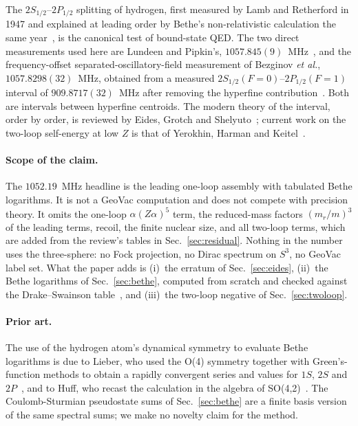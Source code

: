 \documentclass[11pt]{article}
\begin{document}
The $2S_{1/2}$--$2P_{1/2}$ splitting of hydrogen, first measured by
Lamb and Retherford in 1947 and explained at leading order by Bethe's
non-relativistic calculation the same year~\cite{bethe1947}, is the
canonical test of bound-state QED.  The two direct measurements used
here are Lundeen and Pipkin's, $1057.845(9)$~MHz~\cite{lundeen_pipkin1981},
and the frequency-offset separated-oscillatory-field measurement of
Bezginov \emph{et al.}, $1057.8298(32)$~MHz, obtained from a measured
$2S_{1/2}(F{=}0)$--$2P_{1/2}(F{=}1)$ interval of $909.8717(32)$~MHz
after removing the hyperfine contribution~\cite{bezginov2019}.  Both are
intervals between hyperfine centroids.  The modern theory of the
interval, order by order, is reviewed by Eides, Grotch and
Shelyuto~\cite{eides2001}; current work on the two-loop self-energy at
low $Z$ is that of Yerokhin, Harman and
Keitel~\cite{yerokhin2024_two_loop_se}.

\paragraph*{Scope of the claim.}
The $1052.19$~MHz headline is the leading one-loop assembly with
tabulated Bethe logarithms.  It is not a GeoVac computation and does
not compete with precision theory.  It omits the one-loop
$\alpha(Z\alpha)^5$ term, the reduced-mass factors $(m_r/m)^3$ of the
leading terms, recoil, the finite nuclear size, and all two-loop terms,
which are added from the review's tables in Sec.~\ref{sec:residual}.
Nothing in the number uses the three-sphere: no Fock projection, no
Dirac spectrum on $S^3$, no GeoVac label set.  What the paper adds is
(i)~the erratum of Sec.~\ref{sec:eides}, (ii)~the Bethe logarithms of
Sec.~\ref{sec:bethe}, computed from scratch and checked against the
Drake--Swainson table~\cite{drake_swainson}, and (iii)~the two-loop
negative of Sec.~\ref{sec:twoloop}.

\paragraph*{Prior art.}
The use of the hydrogen atom's dynamical symmetry to evaluate Bethe
logarithms is due to Lieber, who used the O(4) symmetry together with
Green's-function methods to obtain a rapidly convergent series and
values for $1S$, $2S$ and $2P$~\cite{lieber1968}, and to Huff, who
recast the calculation in the algebra of SO(4,2)~\cite{huff1969}.  The
Coulomb-Sturmian pseudostate sums of Sec.~\ref{sec:bethe} are a finite
basis version of the same spectral sums; we make no novelty claim for
the method.
\end{document}
